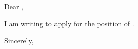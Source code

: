 \documentclass[12pt]{letter}
\begin{document}
\signature{Jonathan P. Chang}
\begin{letter}{
\chairname \\
\chairtitle \\
\department \\
\schoolnamelong \\
\schooladdress
}

\opening{Dear \chairlastname,}

I am writing to apply for the position of \position.



\closing{Sincerely,}

\end{letter}
\end{document}
